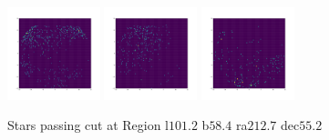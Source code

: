 \documentclass[12pt,prd]{article}
\begin{document}
\begin{figure}[h!]
\includegraphics[width=0.24\textwidth]{../figures/stars_passing_cutgaiascan_l101_2_b58_4_ra212_7_dec55_2_npy_15.pdf}
\includegraphics[width=0.24\textwidth]{../figures/stars_passing_cutgaiascan_l101_2_b58_4_ra212_7_dec55_2_npy_16.pdf}
\includegraphics[width=0.24\textwidth]{../figures/stars_passing_cutgaiascan_l101_2_b58_4_ra212_7_dec55_2_npy_17.pdf}
\caption{Stars passing cut at Region l$101.2$ b$58.4$ ra$212.7$ dec$55.2$}
\end{figure}
\end{document}
